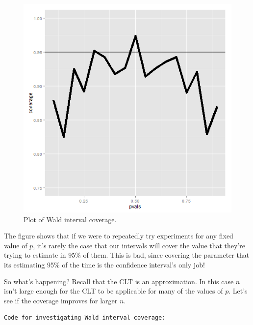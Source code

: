 \documentclass[]{article}
\begin{document}
\begin{figure}[htbp]
\centering
\includegraphics{LeanPub/images/waldCoverage-1.png}
\caption{Plot of Wald interval coverage.}
\end{figure}

The figure shows that if we were to repeatedly try experiments for any
fixed value of $p$, it's rarely the case that our intervals will cover
the value that they're trying to estimate in 95\% of them. This is bad,
since covering the parameter that its estimating 95\% of the time is the
confidence interval's only job!

So what's happening? Recall that the CLT is an approximation. In this
case $n$ isn't large enough for the CLT to be applicable for many of the
values of $p$. Let's see if the coverage improves for larger $n$.

\vspace{1pc}

\verb;Code for investigating Wald interval coverage:;
\end{document}
